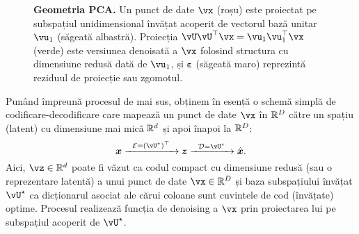 \documentclass[../../book-main_ro.tex]{subfiles}
\begin{document}
\begin{figure}
    \centering
    \caption{\small \textbf{Geometria PCA.} Un punct de date $\vx$ (roșu) este proiectat pe subspațiul unidimensional învățat acoperit de vectorul bază unitar $\vu_1$ (săgeată albastră). Proiecția $\vU\vU^\top\vx = \vu_{1}\vu_{1}^{\top}\vx$ (verde) este versiunea denoisată a $\vx$ folosind structura cu dimensiune redusă dată de $\vu_{1}$, și $\boldsymbol{\varepsilon}$ (săgeată maro) reprezintă reziduul de proiecție sau zgomotul.}
    \label{fig:pca-geometry}
\end{figure}

Punând împreună procesul de mai sus, obținem în esență o schemă simplă de codificare-decodificare care mapează un punct de date $\vx$ în $\mathbb{R}^D$ către un spațiu (latent) cu dimensiune mai mică $\mathbb{R}^d$ și apoi înapoi la $\mathbb{R}^D$:
\begin{equation}
\x \xrightarrow{\hspace{2mm} \mathcal{E} = (\vU^\star)^\top \hspace{2mm}}  \z
    \xrightarrow{\hspace{2mm} \mathcal{D} = \vU^\star \hspace{2mm}}   \hat{\x}.  
\label{eqn:autoencoding-PCA}
\end{equation}
Aici, $\vz \in \R^d$ poate fi văzut ca codul compact cu dimensiune redusă (sau
o reprezentare latentă) a unui punct de date  $\vx \in \R^D$ și baza subspațiului învățat
$\vU^\star$ ca dicționarul asociat ale cărui coloane sunt cuvintele de cod
(învățate) optime. Procesul realizează funcția de denoising a $\vx$ prin
proiectarea lui pe subspațiul acoperit de $\vU^\star$.
\end{document}
